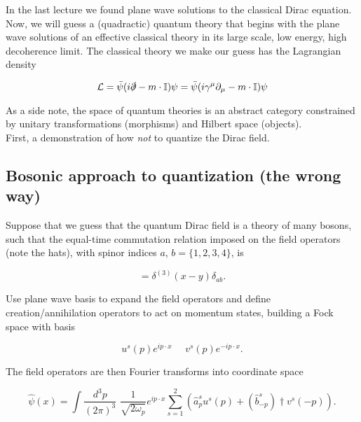
\noindent In the last lecture we found plane wave solutions to the classical Dirac equation. Now, we will guess a (quadractic) quantum theory that begins with the plane wave solutions of an effective classical theory in its large scale, low energy, high decoherence limit. The classical theory we make our guess has the Lagrangian density 

\begin{equation}
\mathcal{L} = \bar{\psi} (i \slashed{\partial} - m \cdot \mathbb{I} ) \psi = \bar{\psi} (i \gamma^\mu \partial_\mu - m \cdot \mathbb{I}) \psi
\end{equation}

\noindent As a side note, the space of quantum theories is an abstract category constrained by unitary transformations (morphisms) and Hilbert space (objects). \\

\noindent First, a demonstration of how \textit{not} to quantize the Dirac field.

\subsection*{Bosonic approach to quantization (the wrong way)}

\noindent Suppose that we guess that the quantum Dirac field is a theory of many bosons, such that the equal-time commutation relation imposed on the field operators (note the hats), with spinor indices $a$, $b = \{1,2,3,4\}$, is

\begin{equation}
[ \hat{\psi}_a (x), \hat{\psi}_b (y) ] = \delta^{(3)} (x-y) \delta_{ab}.
\end{equation} 

\noindent Use plane wave basis to expand the field operators and define creation/annihilation operators to act on momentum states, building a Fock space with basis

\begin{equation}
u^s(p) e^{i p\cdot x} \,\,\,\,\,\,\,\, v^s (p) e^{-i p \cdot x}.
\end{equation}

\noindent The field operators are then Fourier transforms into coordinate space

\begin{equation}
\hat{\psi} (x) = \int \frac{d^3 p}{(2 \pi)^3} \,\, \frac{1}{\sqrt{2 \omega_p}} e^{i p \cdot x} \sum_{s=1}^{2} \left( \hat{a}_p^s u^s(p) + (\hat{b}_{-p}^s)\dagger v^s(-p) \right).
\end{equation}

